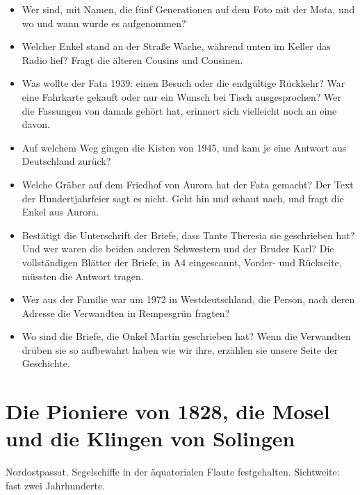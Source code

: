\documentclass[
  ngerman,
  11pt,
  openany]{book}
\providecommand{\tightlist}{%
  \setlength{\itemsep}{0pt}\setlength{\parskip}{0pt}}
\newenvironment{boletim}{\begin{center}\begin{minipage}{0.85\linewidth}\small\itshape}{\end{minipage}\end{center}}
\begin{document}
\begin{itemize}
\tightlist
\item
  Wer sind, mit Namen, die fünf Generationen auf dem Foto mit der Mota,
  und wo und wann wurde es aufgenommen?
\item
  Welcher Enkel stand an der Straße Wache, während unten im Keller das
  Radio lief? Fragt die älteren Cousins und Cousinen.
\item
  Was wollte der Fata 1939: einen Besuch oder die endgültige Rückkehr?
  War eine Fahrkarte gekauft oder nur ein Wunsch bei Tisch
  ausgesprochen? Wer die Fassungen von damals gehört hat, erinnert sich
  vielleicht noch an eine davon.
\item
  Auf welchem Weg gingen die Kisten von 1945, und kam je eine Antwort
  aus Deutschland zurück?
\item
  Welche Gräber auf dem Friedhof von Aurora hat der Fata gemacht? Der
  Text der Hundertjahrfeier sagt es nicht. Geht hin und schaut nach, und
  fragt die Enkel aus Aurora.
\item
  Bestätigt die Unterschrift der Briefe, dass Tante Theresia sie
  geschrieben hat? Und wer waren die beiden anderen Schwestern und der
  Bruder Karl? Die vollständigen Blätter der Briefe, in A4 eingescannt,
  Vorder- und Rückseite, müssten die Antwort tragen.
\item
  Wer aus der Familie war um 1972 in Westdeutschland, die Person, nach
  deren Adresse die Verwandten in Rempesgrün fragten?
\item
  Wo sind die Briefe, die Onkel Martin geschrieben hat? Wenn die
  Verwandten drüben sie so aufbewahrt haben wie wir ihre, erzählen sie
  unsere Seite der Geschichte.
\end{itemize}

\part{Die Pioniere von 1828, die Mosel und die Klingen von
Solingen}\label{die-pioniere-von-1828-die-mosel-und-die-klingen-von-solingen}

\begin{boletim}

Nordostpassat. Segelschiffe in der äquatorialen Flaute festgehalten.
Sichtweite: fast zwei Jahrhunderte.

\end{boletim}
\end{document}
